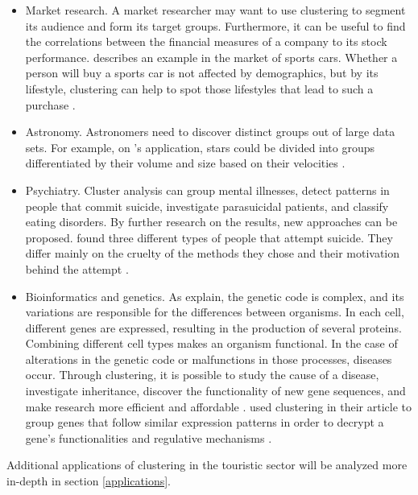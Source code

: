 \begin{itemize}
\item Market research. A market researcher may want to use clustering to segment its audience and form its target groups. Furthermore, it can be useful to find the correlations between the financial measures of a company to its stock performance. \textcite{chakrapani} describes an example in the market of sports cars. Whether a person will buy a sports car is not affected by demographics, but by its lifestyle, clustering can help to spot those lifestyles that lead to such a purchase \autocite[9]{clAnalysis}.
\item Astronomy. Astronomers need to discover distinct groups out of large data sets. For example, on \textcite{astronomy}'s application, stars could be divided into groups differentiated by their volume and size based on their velocities \autocite[10]{clAnalysis}.
\item Psychiatry. Cluster analysis can group mental illnesses, detect patterns in people that commit suicide, investigate parasuicidal patients, and classify eating disorders. By further research on the results, new approaches can be proposed. \textcite{psychiatry} found three different types of people that attempt suicide. They differ mainly on the cruelty of the methods they chose and their motivation behind the attempt \autocite[10]{clAnalysis}.
\item Bioinformatics and genetics. As \textcite{clAnalysis} explain, the genetic code is complex, and its variations are responsible for the differences between organisms. In each cell, different genes are expressed, resulting in the production of several proteins. Combining different cell types makes an organism functional. In the case of alterations in the genetic code or malfunctions in those processes, diseases occur. Through clustering, it is possible to study the cause of a disease, investigate inheritance, discover the functionality of new gene sequences, and make research more efficient and affordable \autocite[12-13]{clAnalysis}. \textcite{bioinformatics} used clustering in their article to group genes that follow similar expression patterns in order to decrypt a gene's functionalities and regulative mechanisms \autocite{bioinformatics}.
\end{itemize}
Additional applications of clustering in the touristic sector will be analyzed more in-depth in section \ref{applications}.

